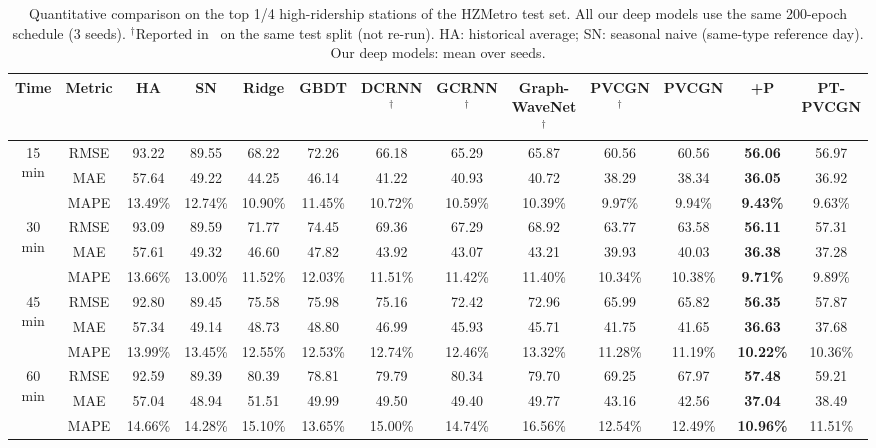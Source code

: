 \begin{table}[t]
\centering
\caption{Quantitative comparison on the top 1/4 high-ridership stations of the HZMetro test set. All our deep models use the same 200-epoch schedule (3 seeds). $^\dagger$Reported in~\cite{liu2022pvcgn} on the same test split (not re-run). HA: historical average; SN: seasonal naive (same-type reference day). Our deep models: mean over seeds.}
\label{tab:hz-top}
\scriptsize
\setlength{\tabcolsep}{3.2pt}
\begin{tabular}{cc|cccc|cccc|ccc}
\toprule
Time & Metric & HA & SN & Ridge & GBDT & DCRNN$^\dagger$ & GCRNN$^\dagger$ & Graph-WaveNet$^\dagger$ & PVCGN$^\dagger$ & PVCGN & +P & PT-PVCGN \\
\midrule
\multirow{3}{*}{15 min} & RMSE & 93.22 & 89.55 & 68.22 & 72.26 & 66.18 & 65.29 & 65.87 & 60.56 & 60.56 & \textbf{56.06} & 56.97 \\
 & MAE & 57.64 & 49.22 & 44.25 & 46.14 & 41.22 & 40.93 & 40.72 & 38.29 & 38.34 & \textbf{36.05} & 36.92 \\
 & MAPE & 13.49\% & 12.74\% & 10.90\% & 11.45\% & 10.72\% & 10.59\% & 10.39\% & 9.97\% & 9.94\% & \textbf{9.43\%} & 9.63\% \\
\midrule
\multirow{3}{*}{30 min} & RMSE & 93.09 & 89.59 & 71.77 & 74.45 & 69.36 & 67.29 & 68.92 & 63.77 & 63.58 & \textbf{56.11} & 57.31 \\
 & MAE & 57.61 & 49.32 & 46.60 & 47.82 & 43.92 & 43.07 & 43.21 & 39.93 & 40.03 & \textbf{36.38} & 37.28 \\
 & MAPE & 13.66\% & 13.00\% & 11.52\% & 12.03\% & 11.51\% & 11.42\% & 11.40\% & 10.34\% & 10.38\% & \textbf{9.71\%} & 9.89\% \\
\midrule
\multirow{3}{*}{45 min} & RMSE & 92.80 & 89.45 & 75.58 & 75.98 & 75.16 & 72.42 & 72.96 & 65.99 & 65.82 & \textbf{56.35} & 57.87 \\
 & MAE & 57.34 & 49.14 & 48.73 & 48.80 & 46.99 & 45.93 & 45.71 & 41.75 & 41.65 & \textbf{36.63} & 37.68 \\
 & MAPE & 13.99\% & 13.45\% & 12.55\% & 12.53\% & 12.74\% & 12.46\% & 13.32\% & 11.28\% & 11.19\% & \textbf{10.22\%} & 10.36\% \\
\midrule
\multirow{3}{*}{60 min} & RMSE & 92.59 & 89.39 & 80.39 & 78.81 & 79.79 & 80.34 & 79.70 & 69.25 & 67.97 & \textbf{57.48} & 59.21 \\
 & MAE & 57.04 & 48.94 & 51.51 & 49.99 & 49.50 & 49.40 & 49.77 & 43.16 & 42.56 & \textbf{37.04} & 38.49 \\
 & MAPE & 14.66\% & 14.28\% & 15.10\% & 13.65\% & 15.00\% & 14.74\% & 16.56\% & 12.54\% & 12.49\% & \textbf{10.96\%} & 11.51\% \\
\bottomrule
\end{tabular}
\end{table}